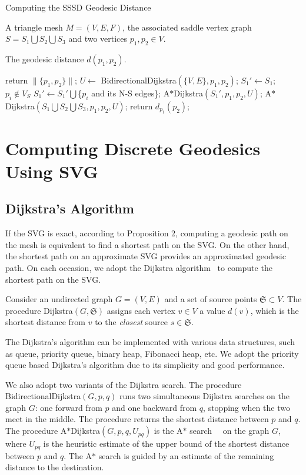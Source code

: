 \begin{algorithm}[htbp]
\caption{Computing the SSSD Geodesic Distance}
\begin{algorithmic}[1]

\Require A triangle mesh $M=(V,E,F)$, the associated saddle vertex
graph $S=S_1\bigcup S_2\bigcup S_3$ and two vertices $p_1, p_2\in
V$.

\Ensure The geodesic distance $d(p_1,p_2)$.

 \State return $\|\{p_1,p_2\}\|$;
\EndIf \State $U \gets$ BidirectionalDijkstra$(\{V,E\}, p_1, p_2)$;
 \State $S_1'\gets S_1$;  \If
{$p_i\notin V_S$} \State $S_1' \gets S_1' \bigcup$\{$p_i$ and its
N-S edges\}; \EndIf \EndFor \State A$*$Dijkstra$(S_1',p_1,p_2,U)$;
\Else \State A$*$Dijkstra$(S_1\bigcup S_2\bigcup S_3,p_1,p_2,U)$;
\EndIf \State return $d_{p_1}(p_2)$;
\end{algorithmic}
\end{algorithm}


\section{Computing Discrete Geodesics Using SVG} \label{sec:geodesic}

\subsection{Dijkstra's Algorithm}
\label{subsec:dijkstra}

If the SVG is exact, according to Proposition 2, computing a
geodesic path on the mesh is equivalent to find a shortest path on
the SVG. On the other hand, the shortest path on an approximate SVG
provides an approximated geodesic path. On each occasion, we adopt
the Dijkstra algorithm~\cite{dijkstra1959note} to compute the shortest path
on the SVG.

Consider an undirected graph $G=(V,E)$ and a set of source points
$\mathfrak{S}\subset V$. The procedure Dijkstra$(G,\mathfrak{S})$ assigns each
vertex $v\in V$ a value $d(v)$, which is the shortest
distance from $v$ to the \textit{closest} source $s\in\mathfrak{S}$.

The Dijkstra's algorithm can be implemented with various data structures, such as queue, priority queue, binary heap, Fibonacci heap, etc.
We adopt the priority queue based Dijkstra's algorithm due to its simplicity and good performance.


We also adopt two variants of the Dijkstra search.
The procedure BidirectionalDijkstra$(G,p,q)$ runs two simultaneous Dijkstra searches on the graph $G$: one forward from $p$ and one backward from $q$, stopping when the two meet in the middle. The procedure returns the shortest distance between $p$ and $q$. The procedure A$*$Dijkstra$(G,p,q,U_{pq})$ is the A$*$ search~\cite{astar}~\cite{Goldberg:2005:CSP:1070432.1070455} on the graph $G$, where $U_{pq}$ is the heuristic estimate of the upper bound of the shortest distance between $p$ and $q$. The A$*$ search is guided by an estimate of the remaining distance to the destination.

